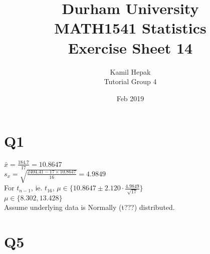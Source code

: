\documentclass[]{article}
\title{\vspace{-3cm}Durham University\\
    MATH1541 Statistics \\
	Exercise Sheet 14}
\author{Kamil Hepak\\
        Tutorial Group 4}
\date{Feb 2019}
\begin{document}
\maketitle
\section{Q1}
$\bar{x} = \frac{184.7}{17} = 10.8647$
\\
$s_x = \sqrt{\frac{2404.41-17\times 10.8647}{16}} = 4.9849$
\\
For $t_{n-1}$, ie. $t_{16}$, $\mu \in \{10.8647 \pm 2.120\cdot\frac{4.9849}{\sqrt{17}}\}$
\\
$\mu \in \{8.302, 13.428\}$
\\
Assume underlying data is Normally (t???) distributed.

\section{Q5}
\end{document}
